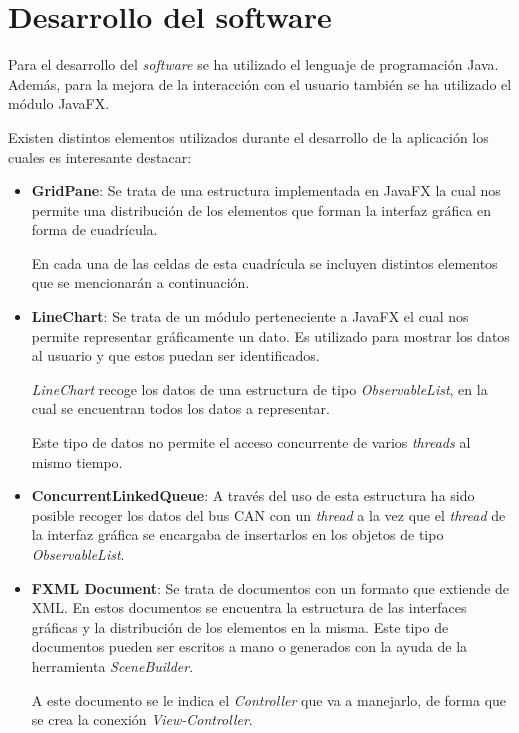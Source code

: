 \section{Desarrollo del software}\label{desarrollo_del_software}


Para el desarrollo del \emph{software} se ha utilizado el lenguaje de programación Java. Además, para la mejora de la interacción con el usuario también se ha utilizado el módulo JavaFX.

Existen distintos elementos utilizados durante el desarrollo de la aplicación los cuales es interesante destacar:

\begin{itemize}
\item
\textbf{GridPane}: Se trata de una estructura implementada en JavaFX la cual nos permite una distribución de los elementos que forman la interfaz gráfica en forma de cuadrícula.

En cada una de las celdas de esta cuadrícula se incluyen distintos elementos que se mencionarán a continuación.
\item
\textbf{LineChart}: Se trata de un módulo perteneciente a JavaFX el cual nos permite representar gráficamente un dato. Es utilizado para mostrar los datos al usuario y que estos puedan ser identificados.

\emph{LineChart} recoge los datos de una estructura de tipo \emph{ObservableList}, en la cual se encuentran todos los datos a representar.

Este tipo de datos no permite el acceso concurrente de varios \emph{threads} al mismo tiempo.


\item
\textbf{ConcurrentLinkedQueue}: A través del uso de esta estructura ha sido posible recoger los datos del bus CAN con un \emph{thread} a la vez que el \emph{thread} de la interfaz gráfica se encargaba de insertarlos en los objetos de tipo \emph{ObservableList}.
\item
\textbf{FXML Document}: Se trata de documentos con un formato que extiende de XML. En estos documentos se encuentra la estructura de las interfaces gráficas y la distribución de los elementos en la misma. Este tipo de documentos pueden ser escritos a mano o generados con la ayuda de la herramienta \emph{SceneBuilder}.

A este documento se le indica el \emph{Controller} que va a manejarlo, de forma que se crea la conexión \emph{View-Controller}.


\end{itemize}

